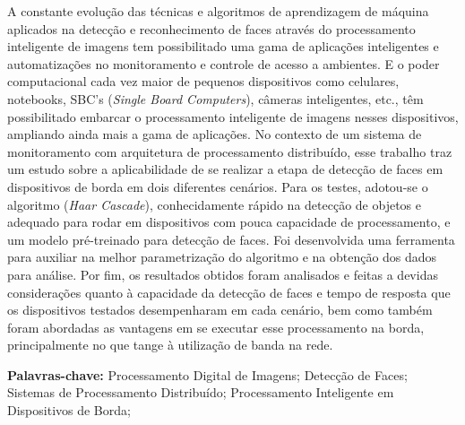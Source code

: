 \begin{resumo}

A constante evolução das técnicas e algoritmos de aprendizagem de máquina aplicados na detecção e reconhecimento de faces através do processamento inteligente de imagens tem possibilitado uma gama de aplicações inteligentes e automatizações no monitoramento e controle de acesso a ambientes. E o poder computacional cada vez maior de pequenos dispositivos como celulares, notebooks, SBC's (\textit{Single Board Computers}), câmeras inteligentes, etc., têm possibilitado embarcar o processamento inteligente de imagens nesses dispositivos, ampliando ainda mais a gama de aplicações. No contexto de um sistema de monitoramento com arquitetura de processamento distribuído, esse trabalho traz um estudo sobre a aplicabilidade de se realizar a etapa de detecção de faces em dispositivos de borda em dois diferentes cenários. Para os testes, adotou-se o algoritmo (\textit{Haar Cascade}), conhecidamente rápido na detecção de objetos e adequado para rodar em dispositivos com pouca capacidade de processamento, e um modelo pré-treinado para detecção de faces. Foi desenvolvida uma ferramenta para auxiliar na melhor parametrização do algoritmo e na obtenção dos dados para análise. Por fim, os resultados obtidos foram analisados e feitas a devidas considerações quanto à capacidade da detecção de faces e tempo de resposta que os dispositivos testados desempenharam em cada cenário, bem como também foram abordadas as vantagens em se executar esse processamento na borda, principalmente no que tange à utilização de banda na rede. 

\vspace{0.5cm}
 
 \textbf{Palavras-chave:} Processamento Digital de Imagens; Detecção de Faces; Sistemas de Processamento Distribuído; Processamento Inteligente em Dispositivos de Borda;

\end{resumo}